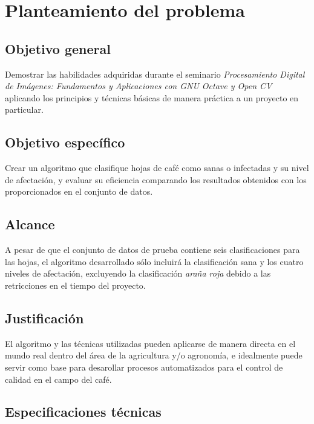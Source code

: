 \chapter{Planteamiento del problema}

\section{Objetivo general}
Demostrar las habilidades adquiridas durante el seminario \textit{Procesamiento Digital de Imágenes: Fundamentos y Aplicaciones con GNU Octave y Open CV} aplicando los principios y técnicas básicas de manera práctica a un proyecto en particular.

\section{Objetivo específico}
Crear un algoritmo que clasifique hojas de café como sanas o infectadas y su nivel de afectación, y evaluar su eficiencia comparando los resultados obtenidos con los proporcionados en el conjunto de datos.

\section{Alcance}
A pesar de que el conjunto de datos de prueba contiene seis clasificaciones para las hojas, el algoritmo desarrollado sólo incluirá la clasificación sana y los cuatro niveles de afectación, excluyendo la clasificación \textit{araña roja} debido a las retricciones en el tiempo del proyecto.

\section{Justificación}
El algoritmo y las técnicas utilizadas pueden aplicarse de manera directa en el mundo real dentro del área de la agricultura y/o agronomía, e idealmente puede servir como base para desarollar procesos automatizados para el control de calidad en el campo del café.

\section{Especificaciones técnicas}